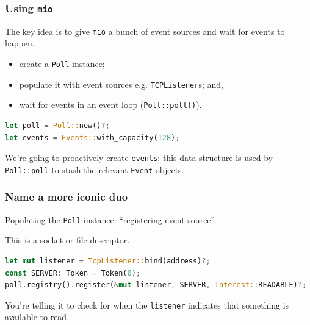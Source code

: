 \begin{frame}[fragile]
\frametitle{Using \texttt{mio}}

The key idea is to give {\tt mio} a bunch of event sources and
wait for events to happen. 

\begin{itemize}
       \item create a \texttt{Poll} instance;
       \item populate it with event sources e.g. \texttt{TCPListener}s; and,
       \item wait for events in an event loop ({\tt Poll::poll()}).
\end{itemize}
     
\begin{lstlisting}[language=Rust]
let poll = Poll::new()?;
let events = Events::with_capacity(128);
\end{lstlisting}

We're going to proactively create \texttt{events}; this data structure is used by
\texttt{Poll::poll} to stash the relevant \texttt{Event} objects.

\end{frame}


\begin{frame}[fragile]
\frametitle{Name a more iconic duo}

Populating the {\tt Poll} instance: ``registering event source''. 

This is a socket or file descriptor.

\begin{lstlisting}[language=Rust]
let mut listener = TcpListener::bind(address)?;
const SERVER: Token = Token(0);
poll.registry().register(&mut listener, SERVER, Interest::READABLE)?;
\end{lstlisting}


You're telling it to check for 
when the \texttt{listener} indicates that something is available to read.

\end{frame}


